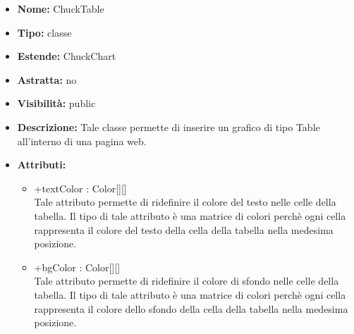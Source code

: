 			
			\begin{itemize}
			\item \textbf{Nome:} ChuckTable
			\item \textbf{Tipo:} classe
			
		\item \textbf{Estende:}
		ChuckChart
		\item \textbf{Astratta:}
		no
			\item \textbf{Visibilità:} public
			\item \textbf{Descrizione:} Tale classe permette di inserire un grafico di tipo Table all'interno di una pagina web.
			\item \textbf{Attributi:}
				\begin{itemize}
				\setlength{\itemsep}{5pt}
				
					\item[\ding{111}] {+textColor : Color[][]} \\ [1mm] Tale attributo permette di ridefinire il colore del testo nelle celle della tabella. Il tipo di tale attributo è una matrice di colori perchè ogni cella rappresenta il colore del testo della cella della tabella nella medesima posizione.
					\item[\ding{111}] {+bgColor : Color[][]} \\ [1mm] Tale attributo permette di ridefinire il colore di sfondo nelle celle della tabella. Il tipo di tale attributo è una matrice di colori perchè ogni cella rappresenta il colore dello sfondo della cella della tabella nella medesima posizione.
				\end{itemize}
		
			\end{itemize}

			